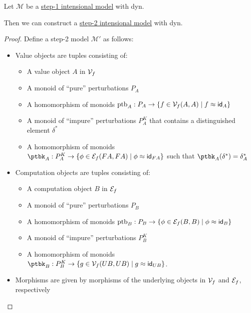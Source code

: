 \begin{lemma}\label{lem:step-1-model-to-step-2-model}
Let $\mathcal M$ be a \hyperref[def:step-1-model]{step-1 intensional model} with dyn.

Then we can construct a \hyperref[def:step-2-model]{step-2 intensional model} with dyn.
\end{lemma}
\begin{proof}

    Define a step-2 model $\mathcal M'$ as follows:
    \begin{itemize}
      \item Value objects are tuples consisting of:
      \begin{itemize}
        \item A value object $A$ in $\mathcal{V}_f$ 
        \item A monoid of ``pure'' perturbations $P_A$ 
        \item A homomorphism of monoids $\text{ptb}_A : P_A \to \{ f \in \mathcal{V}_f(A, A) \mid f \approx \mathsf{id}_A \}$
        \item A monoid of ``impure'' perturbations $P^K_A$ that contains a distinguished element $\delta^*$
        \item A homomorphism of monoids $\ptbk_A : P^K_A \to \{ \phi \in \ef(FA, FA) \mid \phi \bisim \id_{FA} \}$
        such that $\ptbk_A(\delta^*) = \delta_A^*$
      \end{itemize}  

      \item Computation objects are tuples consisting of:
      \begin{itemize}
        \item A computation object $B$ in $\mathcal{E}_f$
        \item A monoid of ``pure'' perturbations $P_B$
        \item A homomorphism of monoids $\text{ptb}_B : P_B \to \{ \phi \in \mathcal{E}_f(B, B) \mid \phi \approx \mathsf{id}_B \}$
        \item A monoid of ``impure'' perturbations $P^K_B$
        \item A homomorphism of monoids $\ptbk_B : P^K_B \to \{ g \in \vf(UB, UB) \mid g \bisim \id_{UB} \}$.
      \end{itemize}

      \item Morphisms are given by morphisms of the underlying objects in $\mathcal{V}_f$ and $\mathcal{E}_f$, respectively
   

\end{itemize}
\end{proof}
